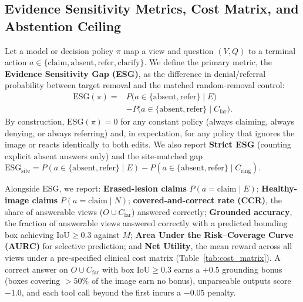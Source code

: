 \documentclass[5p,times,twocolumn,authoryear]{elsarticle}
\begin{document}
\subsection{Evidence Sensitivity Metrics, Cost Matrix, and Abstention Ceiling}
\label{subsec:method_metrics}
Let a model or decision policy $\pi$ map a view and question $(V, Q)$ to a terminal action $a \in \{\text{claim}, \text{absent}, \text{refer}, \text{clarify}\}$. We define the primary metric, the \textbf{Evidence Sensitivity Gap (ESG)}, as the difference in denial/referral probability between target removal and the matched random-removal control:
\begin{equation}
\label{eq:esg}
\begin{split}
\text{ESG}(\pi) = {}& P\big(a \in \{\text{absent}, \text{refer}\} \mid E\big)\\
&- P\big(a \in \{\text{absent}, \text{refer}\} \mid C_{\text{far}}\big).
\end{split}
\end{equation}
By construction, $\text{ESG}(\pi) = 0$ for any constant policy (always claiming, always denying, or always referring) and, in expectation, for any policy that ignores the image or reacts identically to both edits. We also report \textbf{Strict ESG} (counting explicit $\text{absent}$ answers only) and the site-matched gap $\text{ESG}_{\text{site}} = P(a \in \{\text{absent}, \text{refer}\} \mid E) - P(a \in \{\text{absent}, \text{refer}\} \mid C_{\text{ring}})$.

Alongside ESG, we report: \textbf{Erased-lesion claims} $P(a = \text{claim} \mid E)$; \textbf{Healthy-image claims} $P(a = \text{claim} \mid N)$; \textbf{covered-and-correct rate (CCR)}, the share of answerable views ($O \cup C_{\text{far}}$) answered correctly; \textbf{Grounded accuracy}, the fraction of answerable views answered correctly with a predicted bounding box achieving $\text{IoU} \ge 0.3$ against $M$; \textbf{Area Under the Risk--Coverage Curve (AURC)} \citep{geifman2017selective} for selective prediction; and \textbf{Net Utility}, the mean reward across all views under a pre-specified clinical cost matrix (Table~\ref{tab:cost_matrix}). A correct answer on $O \cup C_{\text{far}}$ with box $\text{IoU} \ge 0.3$ earns a $+0.5$ grounding bonus (boxes covering $>50\%$ of the image earn no bonus), unparseable outputs score $-1.0$, and each tool call beyond the first incurs a $-0.05$ penalty.
\end{document}
